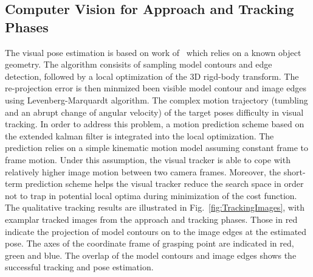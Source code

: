 \subsection{Computer Vision for Approach and Tracking Phases}
%
%
The visual pose estimation is based on work of~\cite{Drummond2002} which relies on a known object geometry. The algorithm consisits of sampling model contours and edge detection, followed by a local optimization of the 3D rigd-body transform. The re-projection error is then minmized been visible model contour and image edges using Levenberg-Marquardt algorithm.
The complex motion trajectory (tumbling and an abrupt change of angular velocity) of the target poses difficulty in visual tracking. In order to address this problem, a motion prediction scheme based on the extended kalman filter is integrated into the local optimization. The prediction relies on a simple kinematic motion model assuming constant frame to frame motion. Under this assumption, the visual tracker is able to cope with relatively higher image motion between two camera frames. Moreover, the short-term prediction scheme helps the visual tracker reduce the search space in order not to trap in potential local optima during minimization of the cost function.  The qualitative tracking results are illustrated in Fig.~\ref{fig:TrackingImages}, with examplar tracked images from the approach and tracking phases. Those in red indicate the projection of model contours on to the image edges at the estimated pose. The axes of the coordinate frame of grasping point are indicated in red, green and blue. The overlap of the model contours and image edges shows the successful tracking and pose estimation.
